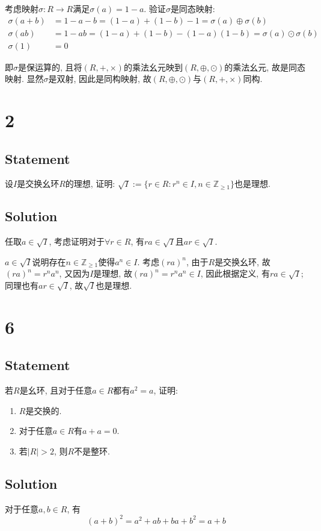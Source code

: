 \documentclass[UTF-8]{ctexart}
\begin{document}
考虑映射$\sigma: R \to R$满足$\sigma(a) = 1 - a$. 验证$\sigma$是同态映射:
\begin{align*}
\sigma(a + b) &= 1 - a - b = (1 - a) + (1 - b) - 1 = \sigma(a) \oplus \sigma(b)\\
\sigma(ab) &= 1 - ab = (1 - a) + (1 - b) - (1 - a)(1 - b) = \sigma(a) \odot \sigma(b)\\
\sigma(1) &= 0
\end{align*}

即$\sigma$是保运算的, 且将$(R, +, \times)$的乘法幺元映到$(R, \oplus, \odot)$的乘法幺元, 故是同态映射. 显然$\sigma$是双射, 因此是同构映射, 故$(R, \oplus, \odot)$与$(R, +, \times)$同构.

\section*{2}
\subsection*{Statement}
设$I$是交换幺环$R$的理想, 证明: $\sqrt I := \{r \in R: r^n \in I, n \in \mathbb Z_{\ge 1}\}$也是理想.
\subsection*{Solution}
任取$a \in \sqrt I$, 考虑证明对于$\forall r \in R$, 有$ra \in \sqrt I$且$ar \in \sqrt I$.

$a \in \sqrt I$说明存在$n \in  \mathbb Z_{\ge 1}$使得$a^n \in I$. 考虑$(ra)^n$, 由于$R$是交换幺环, 故$(ra)^n = r^na^n$, 又因为$I$是理想, 故$(ra)^n = r^na^n \in I$, 因此根据定义, 有$ra \in \sqrt I$; 同理也有$ar \in \sqrt I$, 故$\sqrt I$也是理想.
\section*{6}
\subsection*{Statement}
若$R$是幺环, 且对于任意$a \in R$都有$a^2 = a$, 证明:
\begin{enumerate}
	\item $R$是交换的.
	\item 对于任意$a \in R$有$a + a = 0$.
	\item 若$|R| > 2$, 则$R$不是整环.
\end{enumerate}
\subsection*{Solution}
对于任意$a, b \in R$, 有$$(a + b)^2 = a^2 + ab + ba + b^2 = a + b$$
\end{document}
